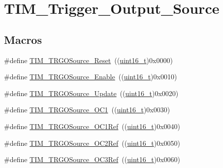 \hypertarget{group___t_i_m___trigger___output___source}{}\section{T\+I\+M\+\_\+\+Trigger\+\_\+\+Output\+\_\+\+Source}
\label{group___t_i_m___trigger___output___source}
\subsection*{Macros}
\begin{DoxyCompactItemize}
\item 
\#define \hyperlink{group___t_i_m___trigger___output___source_gafb039ed39279a4d1134b234797b1cdfb}{T\+I\+M\+\_\+\+T\+R\+G\+O\+Source\+\_\+\+Reset}~((\hyperlink{_p_e___types_8h_a1f1825b69244eb3ad2c7165ddc99c956}{uint16\+\_\+t})0x0000)
\item 
\#define \hyperlink{group___t_i_m___trigger___output___source_gaa228ba6cfafcf676e33e3ee35cb7fc1c}{T\+I\+M\+\_\+\+T\+R\+G\+O\+Source\+\_\+\+Enable}~((\hyperlink{_p_e___types_8h_a1f1825b69244eb3ad2c7165ddc99c956}{uint16\+\_\+t})0x0010)
\item 
\#define \hyperlink{group___t_i_m___trigger___output___source_ga8a73c717070ab1a0ef90326780f20aef}{T\+I\+M\+\_\+\+T\+R\+G\+O\+Source\+\_\+\+Update}~((\hyperlink{_p_e___types_8h_a1f1825b69244eb3ad2c7165ddc99c956}{uint16\+\_\+t})0x0020)
\item 
\#define \hyperlink{group___t_i_m___trigger___output___source_ga2d044b472c021f5484b9f71eb9ca69f1}{T\+I\+M\+\_\+\+T\+R\+G\+O\+Source\+\_\+\+O\+C1}~((\hyperlink{_p_e___types_8h_a1f1825b69244eb3ad2c7165ddc99c956}{uint16\+\_\+t})0x0030)
\item 
\#define \hyperlink{group___t_i_m___trigger___output___source_ga7cb70a2a026dc02136bdbb3dcc483d6c}{T\+I\+M\+\_\+\+T\+R\+G\+O\+Source\+\_\+\+O\+C1\+Ref}~((\hyperlink{_p_e___types_8h_a1f1825b69244eb3ad2c7165ddc99c956}{uint16\+\_\+t})0x0040)
\item 
\#define \hyperlink{group___t_i_m___trigger___output___source_ga059f9f6cf96c833180eb3cdf5e56bd04}{T\+I\+M\+\_\+\+T\+R\+G\+O\+Source\+\_\+\+O\+C2\+Ref}~((\hyperlink{_p_e___types_8h_a1f1825b69244eb3ad2c7165ddc99c956}{uint16\+\_\+t})0x0050)
\item 
\#define \hyperlink{group___t_i_m___trigger___output___source_ga40943bc1c3f22b983c683cbf0e87a218}{T\+I\+M\+\_\+\+T\+R\+G\+O\+Source\+\_\+\+O\+C3\+Ref}~((\hyperlink{_p_e___types_8h_a1f1825b69244eb3ad2c7165ddc99c956}{uint16\+\_\+t})0x0060)

\end{DoxyCompactItemize}
